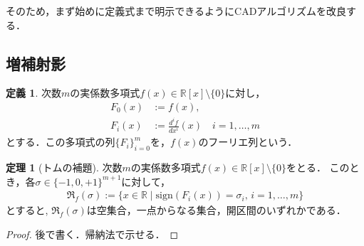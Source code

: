 \documentclass[uplatex, dvipdfmx]{jsarticle}
\newcommand{\R}{\mathbb{R}}
\newcommand{\sign}{\mathrm{sign}}
\theoremstyle{definition}
\newtheorem{definition}{定義}[section]
\newtheorem{theorem}{定理}[section]
\begin{document}
そのため，まず始めに定義式まで明示できるようにCADアルゴリズムを改良する．

\subsection{増補射影}

\begin{definition}
     次数$m$の実係数多項式$f(x) \in \R[x] \setminus \{0\}$に対し，
     \begin{align*}
          F_0(x) &:= f(x),\\
          F_i(x) &:= \frac{d^i f}{dx^i}(x) \quad i = 1, \dots, m
     \end{align*}
     とする．この多項式の列$\{F_i\}_{i=0}^m$を，$f(x)$のフーリエ列という．
\end{definition}

\begin{theorem}[トムの補題]
     次数$m$の実係数多項式$f(x) \in \R[x] \setminus \{0\}$をとる．
     このとき，各$\sigma \in \{-1, 0, +1\}^{m+1}$に対して，
     \begin{align*}
          \mathfrak{R}_f(\sigma) := \{x \in \R \mid \sign(F_i(x)) = \sigma_i, \, i = 1, \dots, m \}
     \end{align*}
     とすると, $\mathfrak{R}_f(\sigma)$は空集合，一点からなる集合，開区間のいずれかである．
\end{theorem}

\begin{proof}
     後で書く．帰納法で示せる．
\end{proof}
\end{document}
